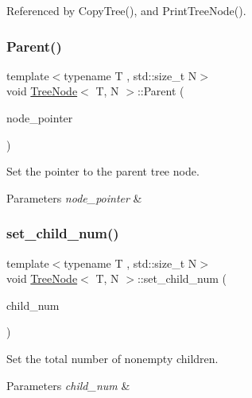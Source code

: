 Referenced by Copy\+Tree(), and Print\+Tree\+Node().

\mbox{\label{classTreeNode_a412b1980ecabb954901391b73332e657}} 
\subsubsection{\texorpdfstring{Parent()}{Parent()}\hspace{0.1cm}{\footnotesize\ttfamily [2/2]}}
{\footnotesize\ttfamily template$<$typename T , std\+::size\+\_\+t N$>$ \\
void \hyperlink{classTreeNode}{Tree\+Node}$<$ T, N $>$\+::Parent (\begin{DoxyParamCaption}\item[{const \hyperlink{classTreeNode}{Tree\+Node}$<$ T, N $>$ $\ast$}]{node\+\_\+pointer }\end{DoxyParamCaption})}

Set the pointer to the parent tree node. 
\begin{DoxyParams}{Parameters}
{\em node\+\_\+pointer} & \\
\hline
\end{DoxyParams}
\mbox{\label{classTreeNode_a68c80783a2900d01a37fc33f14951e66}} 
\subsubsection{\texorpdfstring{set\+\_\+child\+\_\+num()}{set\_child\_num()}}
{\footnotesize\ttfamily template$<$typename T , std\+::size\+\_\+t N$>$ \\
void \hyperlink{classTreeNode}{Tree\+Node}$<$ T, N $>$\+::set\+\_\+child\+\_\+num (\begin{DoxyParamCaption}\item[{const unsigned int}]{child\+\_\+num }\end{DoxyParamCaption})}

Set the total number of nonempty children. 
\begin{DoxyParams}{Parameters}
{\em child\+\_\+num} & \\
\hline
\end{DoxyParams}



